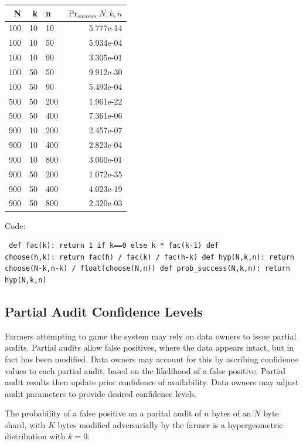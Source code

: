 \documentclass[a4paper,10pt]{article} \usepackage[utf8]{inputenc}
\begin{document}
\begin{table}[hbt!] \begin{center} \begin{tabular}{r r l r} N & k & n &
$\Pr_{success}{N,k,n}$\\ \hline 100 & 10 & 10  & 5.777e-14\\ \hline 100 & 10 &
50  & 5.934e-04\\ \hline 100 & 10 & 90  & 3.305e-01\\ \hline 100 & 50 & 50  &
9.912e-30\\ \hline 100 & 50 & 90  & 5.493e-04\\ \hline 500 & 50 & 200 &
1.961e-22\\ \hline 500 & 50 & 400 & 7.361e-06\\ \hline 900 & 10 & 200 &
2.457e-07\\ \hline 900 & 10 & 400 & 2.823e-04\\ \hline 900 & 10 & 800 &
3.060e-01\\ \hline 900 & 50 & 200 & 1.072e-35\\ \hline 900 & 50 & 400 &
4.023e-19\\ \hline 900 & 50 & 800 & 2.320e-03\\ \end{tabular} \end{center}
\end{table}

Code: \begin{lstlisting} def fac(k): return 1 if k==0 else k * fac(k-1) def
choose(h,k): return fac(h) / fac(k) / fac(h-k) def hyp(N,k,n): return
choose(N-k,n-k) / float(choose(N,n)) def prob_success(N,k,n): return hyp(N,k,n)
\end{lstlisting}

\subsection{Partial Audit Confidence Levels}

Farmers attempting to game the system may rely on data owners to issue partial
audits. Partial audits allow false positives, where the data appears intact, but
in fact has been modified. Data owners may account for this by ascribing
confidence values to each partial audit, based on the likelihood of a false
positive. Partial audit results then update prior confidence of availability.
Data owners may adjust audit parameters to provide desired confidence levels.

The probability of a false positive on a parital audit of $ n $ bytes of an $ N
$ byte shard, with $ K $ bytes modified adversarially by the farmer is a
hypergeometric distribution with $ k = 0 $:
\end{document}
